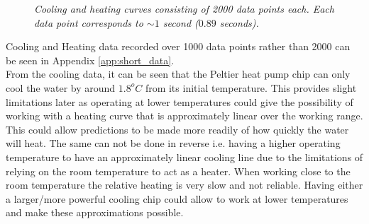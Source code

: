 \documentclass[10pt]{article}
\begin{document}
\begin{figure}[h!]
    \centering
    \qquad
    \caption{\it{Cooling and heating curves consisting of 2000 data points each. Each data point corresponds to $\sim 1$ second ($0.89$ seconds). }}%
    \label{fig:heat_and_cool_curve}%
\end{figure}

Cooling and Heating data recorded over 1000 data points rather than 2000 can be seen in Appendix \ref{app:short_data}.\\

From the cooling data, it can be seen that the Peltier heat pump chip can only cool the water by around $1.8^oC$ from its initial temperature. This provides slight limitations later as operating at lower temperatures could give the possibility of working with a heating curve that is approximately linear over the working range. This could allow predictions to be made more readily of how quickly the water will heat. The same can not be done in reverse i.e. having a higher operating temperature to have an approximately linear cooling line due to the limitations of relying on the room temperature to act as a heater. When working close to the room temperature the relative heating is very slow and not reliable. Having either a larger/more powerful cooling chip could allow to work at lower temperatures and make these approximations possible. \\
\end{document}
